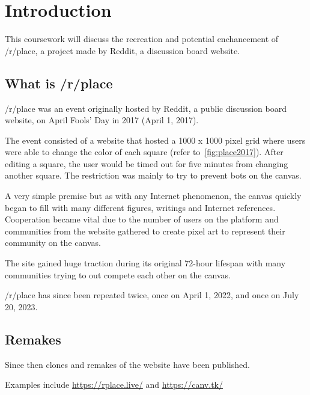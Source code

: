 

\section{Introduction}\label{sec:introduction}

This coursework will discuss the recreation and potential enchancement of /r/place, a project made by Reddit, a discussion board website.

\subsection{What is /r/place}\label{subsec:what-is-/r/place}

/r/place was an event originally hosted by Reddit, a public discussion board website, on April Fools' Day in 2017 (April 1, 2017).

The event consisted of a website that hosted a 1000 x 1000 pixel grid where users were able to change the color of each square (refer to~\ref{fig:place2017}).
After editing a square, the user would be timed out for five minutes from changing another square.
The restriction was mainly to try to prevent bots on the canvas.

A very simple premise but as with any Internet phenomenon, the canvas quickly began to fill with many different figures, writings and Internet references.
Cooperation became vital due to the number of users on the platform and communities from the website gathered to create pixel art to represent their community on the canvas.

The site gained huge traction during its original 72-hour lifespan with many communities trying to out compete each other on the canvas.

/r/place has since been repeated twice, once on April 1, 2022, and once on July 20, 2023.

\subsection{Remakes}\label{subsec:remakes}

Since then clones and remakes of the website have been published.


Examples include  \url{https://rplace.live/} and \url{https://canv.tk/}
